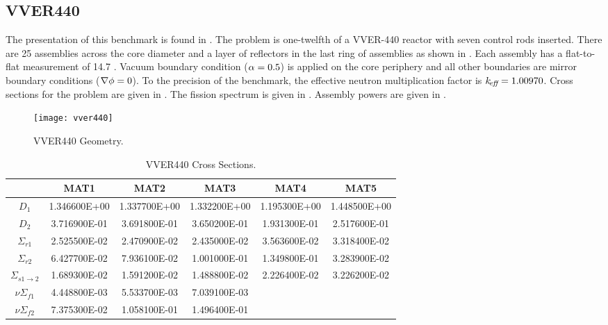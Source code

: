   \subsection{VVER440}
    \label{sec:vver440}
    The presentation of this benchmark is found in \cite{chao}. The problem is
    one-twelfth of a VVER-440 reactor with seven control rods inserted. There
    are 25 assemblies across the core diameter and a layer of reflectors in the
    last ring of assemblies as shown in . Each assembly
    has a flat-to-flat measurement of 14.7 . Vacuum boundary
    condition ($\alpha = 0.5$) is applied on the core periphery and all other
    boundaries are mirror boundary conditions ($\mathbf{\nabla} \phi = 0$). To the
    precision of the benchmark, the effective neutron multiplication factor is
    $k_{\!\mbox{\scriptsize \em eff}} = 1.00970$. Cross sections for the problem are given in
    . The fission spectrum is given in
    . Assembly powers are given in .
    \begin{figure}
      \centering
      \texttt{[image: vver440]}
      \caption{VVER440 Geometry.}
      \label{fig:vver440_geom}
    \end{figure}
    \begin{table}
      \caption{VVER440 Cross Sections.}
      \label{tab:vver440xs}
      \begin{center}
        \begin{tabular}{cccccc}
          \toprule
          &MAT1&MAT2&MAT3&MAT4&MAT5\\
          \midrule
          $D_1$&1.346600E+00&1.337700E+00&1.332200E+00&1.195300E+00&1.448500E+00\\
          $D_2$&3.716900E-01&3.691800E-01&3.650200E-01&1.931300E-01&2.517600E-01\\
          $\Sigma_{r1}$&2.525500E-02&2.470900E-02&2.435000E-02&3.563600E-02&3.318400E-02\\
          $\Sigma_{r2}$&6.427700E-02&7.936100E-02&1.001000E-01&1.349800E-01&3.283900E-02\\
          $\Sigma_{s 1\rightarrow 2}$&1.689300E-02&1.591200E-02&1.488800E-02&2.226400E-02&3.226200E-02\\
          $ \nu \Sigma_{f1}$&4.448800E-03&5.533700E-03&7.039100E-03&&\\
          $ \nu \Sigma_{f2}$&7.375300E-02&1.058100E-01&1.496400E-01&&\\
          \bottomrule
        \end{tabular}
      \end{center}
    \end{table}
